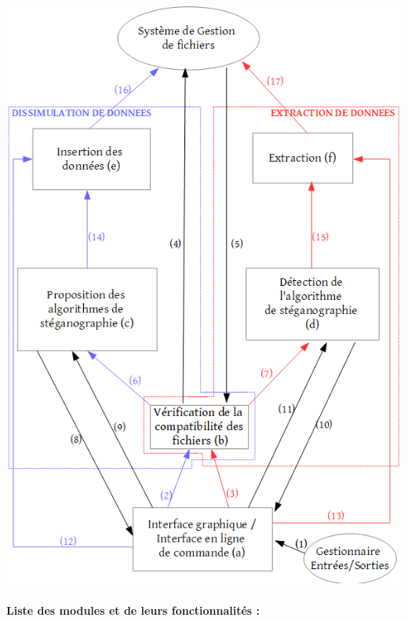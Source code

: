 \documentclass[11pt]{article}
\begin{document}
\hspace{1cm}
\includegraphics[scale=0.71]{pictures/organigramme.png}

\paragraph{Liste des modules et de leurs fonctionnalités :}
\end{document}

